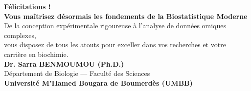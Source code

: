 \documentclass[aspectratio=169,10pt]{beamer}
\begin{document}
\begin{frame}[plain]
  \begin{center}
    \vspace{1.2cm}
    {\Huge\color{BioNavy}\textbf{Félicitations !}}\\[0.6cm]
    {\Large\textbf{Vous maîtrisez désormais les fondements de la Biostatistique Moderne}}\\[0.3cm]
    {\normalsize De la conception expérimentale rigoureuse à l'analyse de données omiques complexes,}\\[0.1cm]
    {\normalsize vous disposez de tous les atouts pour exceller dans vos recherches et votre carrière en biochimie.}\\[1.0cm]
    \textbf{Dr. Sarra BENMOUMOU (Ph.D.)}\\
    \small Département de Biologie --- Faculté des Sciences\\
    \textbf{Université M'Hamed Bougara de Boumerdès (UMBB)}
  \end{center}
\end{frame}
\end{document}
